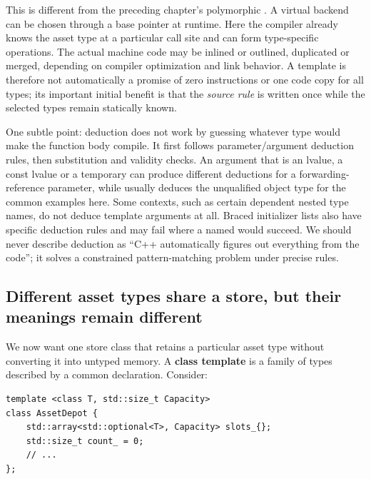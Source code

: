 This is different from the preceding chapter's polymorphic . A virtual backend can be chosen through a base pointer at runtime. Here the compiler already knows the asset type at a particular call site and can form type-specific operations. The actual machine code may be inlined or outlined, duplicated or merged, depending on compiler optimization and link behavior. A template is therefore not automatically a promise of zero instructions or one code copy for all types; its important initial benefit is that the \emph{source rule} is written once while the selected types remain statically known.

One subtle point: deduction does not work by guessing whatever type would make the function body compile. It first follows parameter/argument deduction rules, then substitution and validity checks. An argument that is an lvalue, a const lvalue or a temporary can produce different deductions for a forwarding-reference parameter, while  usually deduces the unqualified object type for the common examples here. Some contexts, such as certain dependent nested type names, do not deduce template arguments at all. Braced initializer lists also have specific deduction rules and may fail where a named  would succeed. We should never describe deduction as ``C++ automatically figures out everything from the code''; it solves a constrained pattern-matching problem under precise rules.

\subsection{Different asset types share a store, but their meanings remain different}\label{01-foundations-i-ch005-different-asset-types-share-a-store-but-their-meanings-remain-different}

\hypertarget{01-foundations-i-ch005-different-asset-types-share-a-store-but-their-meanings-remain-different}{}

We now want one store class that retains a particular asset type without converting it into untyped memory. A \textbf{class template} is a family of types described by a common declaration. Consider:

\begin{verbatim}
template <class T, std::size_t Capacity>
class AssetDepot {
    std::array<std::optional<T>, Capacity> slots_{};
    std::size_t count_ = 0;
    // ...
};
\end{verbatim}

